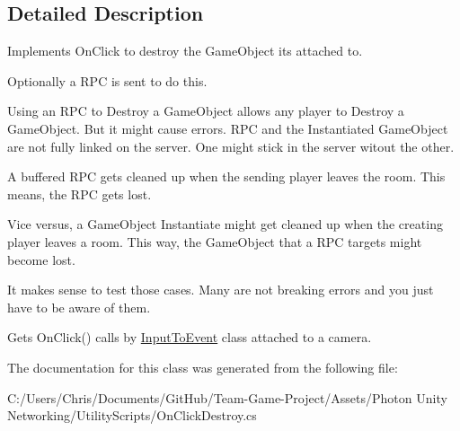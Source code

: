 \subsection{Detailed Description}
Implements On\+Click to destroy the Game\+Object it\textquotesingle{}s attached to. 

Optionally a R\+PC is sent to do this. 

Using an R\+PC to Destroy a Game\+Object allows any player to Destroy a Game\+Object. But it might cause errors. R\+PC and the Instantiated Game\+Object are not fully linked on the server. One might stick in the server witout the other.

A buffered R\+PC gets cleaned up when the sending player leaves the room. This means, the R\+PC gets lost.

Vice versus, a Game\+Object Instantiate might get cleaned up when the creating player leaves a room. This way, the Game\+Object that a R\+PC targets might become lost.

It makes sense to test those cases. Many are not breaking errors and you just have to be aware of them.

Gets On\+Click() calls by \hyperlink{class_input_to_event}{Input\+To\+Event} class attached to a camera. 

The documentation for this class was generated from the following file\+:\begin{DoxyCompactItemize}
\item 
C\+:/\+Users/\+Chris/\+Documents/\+Git\+Hub/\+Team-\/\+Game-\/\+Project/\+Assets/\+Photon Unity Networking/\+Utility\+Scripts/On\+Click\+Destroy.\+cs\end{DoxyCompactItemize}
